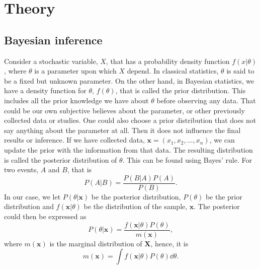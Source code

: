 \newpage
\section{Theory}
\subsection{Bayesian inference}
Consider a stochastic variable, $X$, that has a probability density function $f(x|\theta)$, where $\theta$ is a parameter upon which $X$ depend. In classical statistics, $\theta$ is said to be a fixed but unknown parameter. On the other hand, in Bayesian statistics, we have a density function for $\theta$, $f(\theta)$, that is called the prior distribution. This includes all the prior knowledge we have about $\theta$ before observing any data. That could be our own subjective believes about the parameter, or other previously collected data or studies. One could also choose a prior distribution that does not say anything about the parameter at all. Then it does not influence the final results or inference. 
If we have collected data, $\textbf{x} = (x_1,x_2,...,x_n)$, we can update the prior with the information from that data. The resulting distribution is called the posterior distribution of $\theta$. This can be found using Bayes' rule. For two events, $A$ and $B$, that is
\begin{equation*}
    P(A|B)=\frac{P(B|A)P(A)}{P(B)}.
\end{equation*}%
In our case, we let $P(\theta|\textbf{x})$ be the posterior distribution, $P(\theta)$ be the prior distribution and $f(\textbf{x}|\theta)$ be the distribution of the sample, $\textbf{x}$. The posterior could then be expressed as
\begin{equation*}
    P(\theta|\textbf{x}) = \frac{f(\textbf{x}|\theta)P(\theta)}{m(\textbf{x})},
\end{equation*}
where $m(\textbf{x})$ is the marginal distribution of $\textbf{X}$, hence, it is
\begin{equation*}
    m(\textbf{x}) = \int f(\textbf{x}|\theta) P(\theta) \dd \theta.
\end{equation*}
